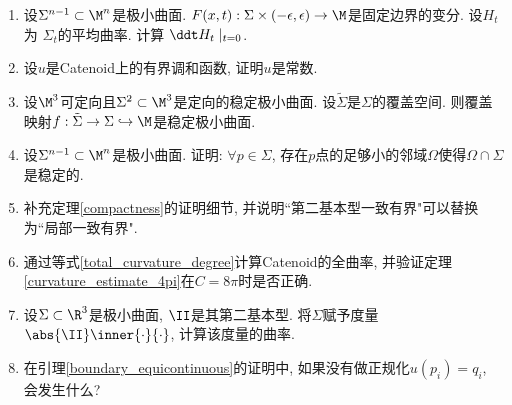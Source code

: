 \begin{enumerate}
    \item 设$\Sigma^{n-1} \subset \M^n$是极小曲面. $F(x,t): \Sigma \times (-\epsilon, \epsilon)\to \M$是固定边界的变分. 设$H_t$为 $\Sigma_t$的平均曲率. 计算 $\ddt H_t \mid _{t=0}$.
    \item 设$u$是Catenoid上的有界调和函数, 证明$u$是常数.
    \item 设$\M^3$可定向且$\Sigma^2 \subset \M^3$是定向的稳定极小曲面. 设$\tilde{\Sigma}$是$\Sigma$的覆盖空间. 则覆盖映射$f:\tilde{\Sigma}\to \Sigma \hookrightarrow \M$是稳定极小曲面.
    \item 设$\Sigma^{n-1} \subset \M^n$是极小曲面. 证明: $\forall p \in \Sigma$, 存在$p$点的足够小的邻域$\Omega$使得$\Omega \cap \Sigma$是稳定的.
    \item 补充定理\eqref{compactness}的证明细节, 并说明``第二基本型一致有界"可以替换为``局部一致有界".
    \item 通过等式\eqref{total_curvature_degree}计算Catenoid的全曲率, 并验证定理\eqref{curvature_estimate_4pi}在$C=8\pi$时是否正确.
    \item 设$\Sigma \subset \R^3$是极小曲面, $\II$是其第二基本型. 将$\Sigma$赋予度量$\abs{\II}\inner{\cdot}{\cdot}$, 计算该度量的曲率.
    \item 在引理\eqref{boundary_equicontinuous}的证明中, 如果没有做正规化$u(p_i)=q_i$, 会发生什么?
\end{enumerate}